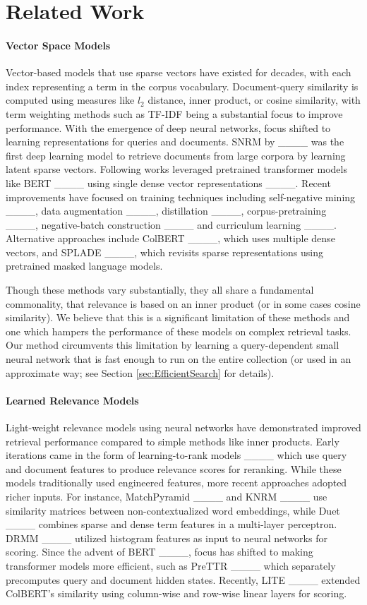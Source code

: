 \section{Related Work}
\paragraph{\textbf{Vector Space Models}}

Vector-based models that use sparse vectors have existed for decades, with each index representing a term in the corpus vocabulary. Document-query similarity is computed using measures like $l_2$ distance, inner product, or cosine similarity, with term weighting methods such as TF-IDF being a substantial focus to improve performance. With the emergence of deep neural networks, focus shifted to learning representations for queries and documents. SNRM by ____ was the first deep learning model to retrieve documents from large corpora by learning latent sparse vectors. Following works leveraged pretrained transformer models like BERT ____ using single dense vector representations ____. Recent improvements have focused on training techniques including self-negative mining ____, data augmentation ____, distillation ____, corpus-pretraining ____, negative-batch construction ____ and curriculum learning ____. Alternative approaches include ColBERT ____, which uses multiple dense vectors, and SPLADE ____, which revisits sparse representations using pretrained masked language models.

Though these methods vary substantially, they all share a fundamental commonality, that relevance is based on an inner product (or in some cases cosine similarity). We believe that this is a significant limitation of these methods and one which hampers the performance of these models on complex retrieval tasks. Our method circumvents this limitation by learning a query-dependent small neural network that is fast enough to run on the entire collection (or used in an approximate way; see Section \ref{sec:EfficientSearch} for details).

\paragraph{\textbf{Learned Relevance Models}}

Light-weight relevance models using neural networks have demonstrated improved retrieval performance compared to simple methods like inner products. Early iterations came in the form of learning-to-rank models ____ which use query and document features to produce relevance scores for reranking. While these models traditionally used engineered features, more recent approaches adopted richer inputs. For instance, MatchPyramid ____ and KNRM ____ use similarity matrices between non-contextualized word embeddings, while Duet ____ combines sparse and dense term features in a multi-layer perceptron. DRMM ____ utilized histogram features as input to neural networks for scoring. Since the advent of BERT ____, focus has shifted to making transformer models more efficient, such as PreTTR ____ which separately precomputes query and document hidden states. Recently, LITE ____ extended ColBERT's similarity using column-wise and row-wise linear layers for scoring.

